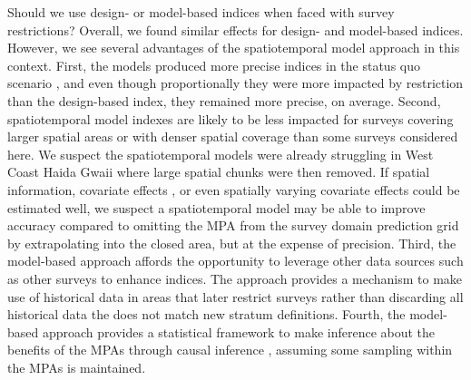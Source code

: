 \documentclass[12pt]{article}
\begin{document}
\begin{spacing}{1.4}
Should we use design- or model-based indices when faced with survey restrictions?
Overall, we found similar effects for design- and model-based indices.
However, we see several advantages of the spatiotemporal model approach in this context.
First, the models produced more precise indices in the status quo scenario \citep[sensu][]{thorson2015a}, and even though proportionally they were more impacted by restriction than the design-based index, they remained more precise, on average.
Second, spatiotemporal model indexes are likely to be less impacted for surveys covering larger spatial areas or with denser spatial coverage than some surveys considered here.
We suspect the spatiotemporal models were already struggling in West Coast Haida Gwaii where large spatial chunks were then removed.
If spatial information, covariate effects \citep{johnson2019}, or even spatially varying covariate effects \citep{hastie1993, barnett2021a, thorson2023svc} could be estimated well, we suspect a spatiotemporal model may be able to improve accuracy compared to omitting the MPA from the survey domain prediction grid by extrapolating into the closed area, but at the expense of precision.
Third, the model-based approach affords the opportunity to leverage other data sources such as other surveys \citep[e.g.,][]{gruss2019, webster2020, monnahan2021} to enhance indices.
The approach provides a mechanism to make use of historical data in areas that later restrict surveys rather than discarding all historical data the does not match new stratum definitions.
Fourth, the model-based approach provides a statistical framework to make inference about the benefits of the MPAs through causal inference \citep[e.g.,][]{pearl2016}, assuming some sampling within the MPAs is maintained.


\end{spacing}
\end{document}

